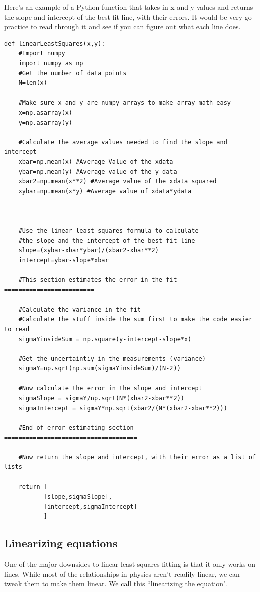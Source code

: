 \documentclass[twoside,11pt,ShortChapTitles]{BYUTextbook}
\begin{document}
Here's an example of a Python function that takes in x and y values and returns the slope and intercept of the best fit line, with their errors.  It would be very go practice to read through it and see if you can figure out what each line does.
\begin{Verbatim}
def linearLeastSquares(x,y):
    #Import numpy
    import numpy as np
    #Get the number of data points
    N=len(x)

    #Make sure x and y are numpy arrays to make array math easy
    x=np.asarray(x)
    y=np.asarray(y)

    #Calculate the average values needed to find the slope and intercept
    xbar=np.mean(x) #Average Value of the xdata
    ybar=np.mean(y) #Average value of the y data
    xbar2=np.mean(x**2) #Average value of the xdata squared
    xybar=np.mean(x*y) #Average value of xdata*ydata



    #Use the linear least squares formula to calculate
    #the slope and the intercept of the best fit line
    slope=(xybar-xbar*ybar)/(xbar2-xbar**2)
    intercept=ybar-slope*xbar

    #This section estimates the error in the fit =========================

    #Calculate the variance in the fit
    #Calculate the stuff inside the sum first to make the code easier to read
    sigmaYinsideSum = np.square(y-intercept-slope*x)

    #Get the uncertaintiy in the measurements (variance)
    sigmaY=np.sqrt(np.sum(sigmaYinsideSum)/(N-2))

    #Now calculate the error in the slope and intercept
    sigmaSlope = sigmaY/np.sqrt(N*(xbar2-xbar**2))
    sigmaIntercept = sigmaY*np.sqrt(xbar2/(N*(xbar2-xbar**2)))

    #End of error estimating section =====================================

    #Now return the slope and intercept, with their error as a list of lists

    return [
           [slope,sigmaSlope],
           [intercept,sigmaIntercept]
           ]
\end{Verbatim}





\subsection{Linearizing equations}
One of the major downsides to linear least squares fitting is that it only works on lines.  While most of the relationships in physics aren't readily linear, we can tweak them to make them linear.  We call this ``linearizing the equation".
\end{document}

